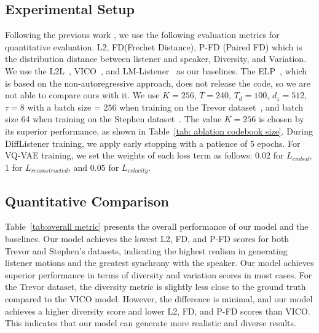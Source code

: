 \subsection{Experimental Setup}
Following the previous work \cite{ng2023can,ng2022learning}, 
we use the following evaluation metrics for quantitative evaluation. L2, FD(Frechet Distance), P-FD (Paired FD) which is the distribution distance between listener and speaker, Diversity, and Variation.
We use the L2L~\cite{ng2022learning}, VICO~\cite{zhou2022responsive}, and LM-Listener~\cite{ng2023can} as our baselines.
The ELP~\cite{song2023emotional}, which is based on the non-autoregressive approach, does not release the code, so we are not able to compare ours with it.
We use $K=256$, $T=240$, $T_d=100$, $d_z=512$, $\tau=8$ with a batch size = $256$ when training on the Trevor dataset~\cite{ng2023can}, and batch size 64 when training on the Stephen dataset~\cite{ng2023can}.
The value $K=256$ is chosen by its superior performance, as shown in Table~\ref{tab: ablation codebook size}.
During DiffListener training, we apply early stopping with a patience of 5 epochs. For VQ-VAE training, we set the weights of each loss term as follows: $0.02$ for $L_{embed}$, $1$ for $L_{reconstructed}$, and $0.05$ for $L_{velocity}$.

\subsection{Quantitative Comparison}
Table~\ref{tab:overall metric} presents the overall performance of our model and the baselines. Our model achieves the lowest L2, FD, and P-FD scores for both Trevor and Stephen's datasets, indicating the highest realism in generating listener motions and the greatest synchrony with the speaker.
Our model achieves superior performance in terms of diversity and variation scores in most cases. 
For the Trevor dataset, the diversity metric is slightly less close to the ground truth compared to the VICO model. 
However, the difference is minimal, and our model achieves a higher diversity score and lower L2, FD, and P-FD scores than VICO. This indicates that our model can generate more realistic and diverse results.

